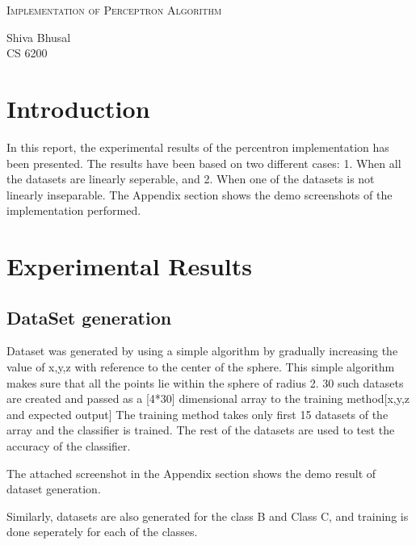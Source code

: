 \documentclass[letterpaper]{article}
\newcommand{\reporttitle}{Implementation of Perceptron Algorithm}
\newcommand{\name}{Shiva Bhusal}
\newcommand{\course}{CS 6200}
\begin{document}
\begin{center}{\huge \scshape \reporttitle}\end{center}
\begin{center}\vspace{0.2em} {\Large \name\\}
  {\course}\end{center}
  
  
  \section{Introduction}
  In this report, the experimental results of the percentron implementation has been presented. The results have been based on two different cases: 1. When all the datasets are linearly seperable, and 2. When one of the datasets is not linearly inseparable. The Appendix section shows the demo screenshots of the implementation performed. 

  \section {Experimental Results}
  \subsection {DataSet generation}
  Dataset was generated by using a simple algorithm by gradually increasing the value of x,y,z with reference to the center of the sphere. This simple algorithm makes sure that all the points lie within the sphere of radius 2. 30 such datasets are created and passed as a [4*30] dimensional array to the training method[x,y,z and expected output] The training method takes only first 15 datasets of the array and the classifier is trained. The rest of the datasets are used to test the accuracy of the classifier. 

  The attached screenshot in the Appendix section shows the demo result of dataset generation. 
  
  Similarly, datasets are also generated for the class B and Class C, and training is done seperately for each of the classes. 
\end{document}
